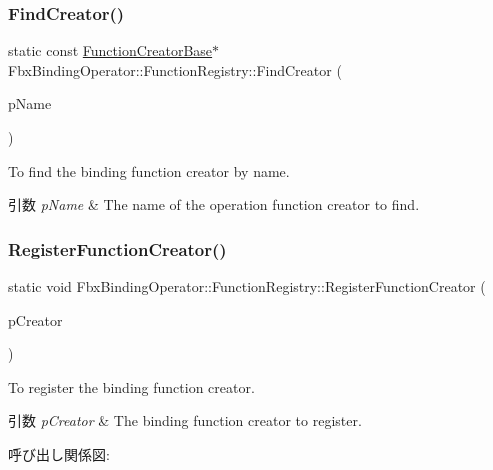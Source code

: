 \subsubsection{\texorpdfstring{Find\+Creator()}{FindCreator()}}
{\footnotesize\ttfamily static const \hyperlink{class_fbx_binding_operator_1_1_function_creator_base}{Function\+Creator\+Base}$\ast$ Fbx\+Binding\+Operator\+::\+Function\+Registry\+::\+Find\+Creator (\begin{DoxyParamCaption}\item[{const char $\ast$}]{p\+Name }\end{DoxyParamCaption})\hspace{0.3cm}{\ttfamily [static]}}

To find the binding function creator by name. 
\begin{DoxyParams}{引数}
{\em p\+Name} & The name of the operation function creator to find. \\
\hline
\end{DoxyParams}
\mbox{\label{class_fbx_binding_operator_1_1_function_registry_a5ecec300a953a369fb892a46a362e384}} 
\subsubsection{\texorpdfstring{Register\+Function\+Creator()}{RegisterFunctionCreator()}}
{\footnotesize\ttfamily static void Fbx\+Binding\+Operator\+::\+Function\+Registry\+::\+Register\+Function\+Creator (\begin{DoxyParamCaption}\item[{\hyperlink{class_fbx_binding_operator_1_1_function_creator_base}{Function\+Creator\+Base} const \&}]{p\+Creator }\end{DoxyParamCaption})\hspace{0.3cm}{\ttfamily [static]}}

To register the binding function creator. 
\begin{DoxyParams}{引数}
{\em p\+Creator} & The binding function creator to register. \\
\hline
\end{DoxyParams}
呼び出し関係図\+:
\mbox{\label{class_fbx_binding_operator_1_1_function_registry_a8395c776992e40df9639032984dcc094}} 
